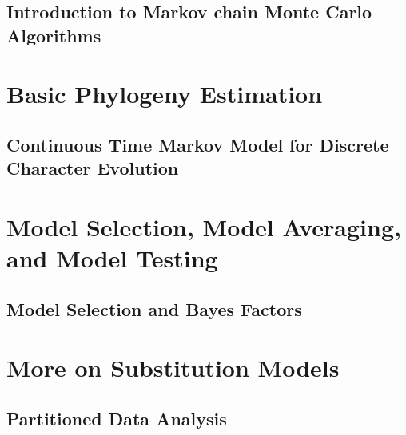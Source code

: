 \documentclass[11pt]{book}
\begin{document}
\chapter{Introduction to Markov chain Monte Carlo Algorithms}
\def \ResourcePath {RB_MCMC_Intro_Tutorial/}


%


\part{Basic Phylogeny Estimation}

\chapter{Continuous Time Markov Model for Discrete Character Evolution}
\def \ResourcePath {RB_CTMC_Tutorial/}



\part{Model Selection, Model Averaging, and Model Testing}

\chapter{Model Selection and Bayes Factors}
\def \ResourcePath {RB_BayesFactor_Tutorial/}



\part{More on Substitution Models}

\chapter{Partitioned Data Analysis}
\def \ResourcePath {RB_Partition_Tutorial/}

\end{document}
